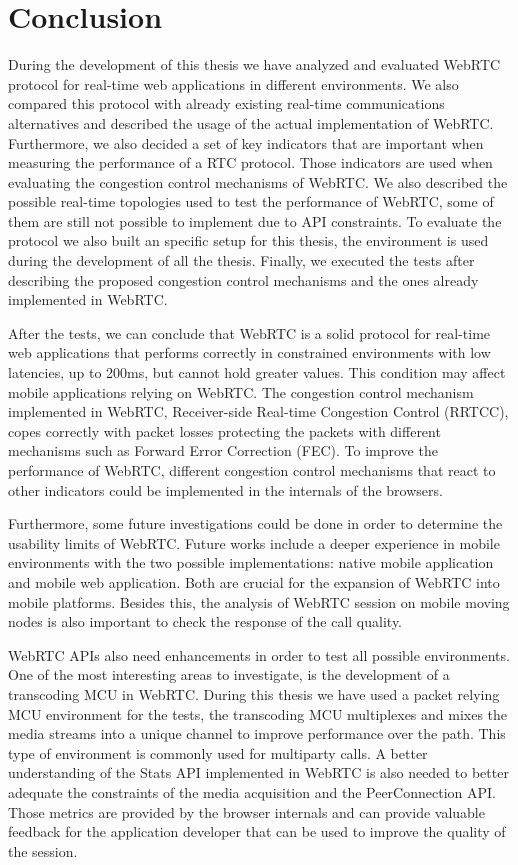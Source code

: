 \section{Conclusion}

\thispagestyle{empty}

During the development of this thesis we have analyzed and evaluated WebRTC protocol for real-time web applications in different environments. We also compared this protocol with already existing real-time communications alternatives and described the usage of the actual implementation of WebRTC. Furthermore, we also decided a set of key indicators that are important when measuring the performance of a RTC protocol. Those indicators are used when evaluating the congestion control mechanisms of WebRTC. We also described the possible real-time topologies used to test the performance of WebRTC, some of them are still not possible to implement due to API constraints. To evaluate the protocol we also built an specific setup for this thesis, the environment is used during the development of all the thesis. Finally, we executed the tests after describing the proposed congestion control mechanisms and the ones already implemented in WebRTC.

After the tests, we can conclude that WebRTC is a solid protocol for real-time web applications that performs correctly in constrained environments with low latencies, up to 200ms, but cannot hold greater values. This condition may affect mobile applications relying on WebRTC. The congestion control mechanism implemented in WebRTC, Receiver-side Real-time Congestion Control (RRTCC), copes correctly with packet losses protecting the packets with different mechanisms such as Forward Error Correction (FEC). To improve the performance of WebRTC, different congestion control mechanisms that react to other indicators could be implemented in the internals of the browsers.

Furthermore, some future investigations could be done in order to determine the usability limits of WebRTC. Future works include a deeper experience in mobile environments with the two possible implementations: native mobile application and mobile web application. Both are crucial for the expansion of WebRTC into mobile platforms. Besides this, the analysis of WebRTC session on mobile moving nodes is also important to check the response of the call quality.

WebRTC APIs also need enhancements in order to test all possible environments. One of the most interesting areas to investigate, is the development of a transcoding MCU in WebRTC. During this thesis we have used a packet relying MCU environment for the tests, the transcoding MCU multiplexes and mixes the media streams into a unique channel to improve performance over the path. This type of environment is commonly used for multiparty calls. A better understanding of the Stats API implemented in WebRTC is also needed to better adequate the constraints of the media acquisition and the PeerConnection API. Those metrics are provided by the browser internals and can provide valuable feedback for the application developer that can be used to improve the quality of the session.

